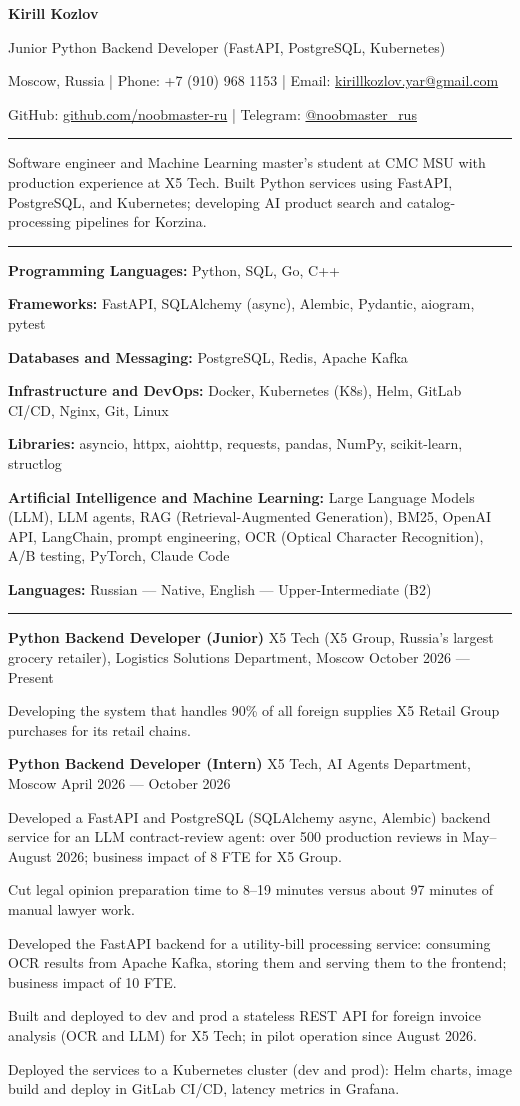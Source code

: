 \documentclass[10pt,a4paper]{article}
\newcommand{\cvsection}[1]{%
  \vspace{5pt}{\large\bfseries #1}\par\vspace{2pt}\hrule\vspace{4pt}}
\newcommand{\cventry}[3]{%
  \textbf{#1} \textbar{} #3 \textbar{} #2\par\vspace{1pt}}
\newcommand{\skilllangs}{\textbf{Programming Languages:} Python, SQL, Go, C++\par}
\newcommand{\skillai}{\textbf{Artificial Intelligence and Machine Learning:} Large Language Models (LLM),
LLM agents, RAG (Retrieval-Augmented Generation), BM25, OpenAI API, LangChain, prompt engineering,
OCR (Optical Character Recognition), A/B testing, PyTorch, Claude Code\par}
\newcommand{\skillframeworks}{\textbf{Frameworks:} FastAPI, SQLAlchemy (async), Alembic, Pydantic, aiogram, pytest\par}
\newcommand{\skilllibs}{\textbf{Libraries:} asyncio, httpx, aiohttp, requests, pandas, NumPy, scikit-learn, structlog\par}
\newcommand{\skilldb}{\textbf{Databases and Messaging:} PostgreSQL, Redis, Apache Kafka\par}
\newcommand{\skillinfra}{\textbf{Infrastructure and DevOps:} Docker, Kubernetes (K8s), Helm, GitLab CI/CD, Nginx, Git, Linux\par}
\newcommand{\skillhuman}{\textbf{Languages:} Russian --- Native, English --- Upper-Intermediate (B2)}
\begin{document}
{\LARGE\bfseries Kirill Kozlov}\par\vspace{3pt}
Junior Python Backend Developer (FastAPI, PostgreSQL, Kubernetes)\par\vspace{3pt}
Moscow, Russia | Phone: +7 (910) 968 1153 | Email: \href{mailto:kirillkozlov.yar@gmail.com}{kirillkozlov.yar@gmail.com}\par
GitHub: \href{https://github.com/noobmaster-ru}{github.com/noobmaster-ru} | Telegram: \href{https://t.me/noobmaster_rus}{@noobmaster\_rus}

\cvsection{Professional Summary}
Software engineer and Machine Learning master's student at CMC MSU with production experience at X5 Tech. Built Python services using FastAPI, PostgreSQL, and Kubernetes; developing AI product search and catalog-processing pipelines for Korzina.

\cvsection{Technical Skills}
\skilllangs
\skillframeworks\skilldb\skillinfra\skilllibs\skillai
\skillhuman

\cvsection{Work Experience}
\cventry{Python Backend Developer (Junior)}{October 2026 --- Present}{X5 Tech (X5 Group, Russia's largest grocery retailer), Logistics Solutions Department, Moscow}
\begin{cvitems}
    \item Developing the system that handles 90\% of all foreign supplies X5 Retail Group purchases for its retail chains.
\end{cvitems}
\vspace{2pt}

\cventry{Python Backend Developer (Intern)}{April 2026 --- October 2026}{X5 Tech, AI Agents Department, Moscow}
\begin{cvitems}
%
    \item Developed a FastAPI and PostgreSQL (SQLAlchemy async, Alembic) backend service for an LLM contract-review agent: over 500 production reviews in May--August 2026; business impact of 8 FTE for X5 Group.
    \item Cut legal opinion preparation time to 8--19 minutes versus about 97 minutes of manual lawyer work.
    \item Developed the FastAPI backend for a utility-bill processing service: consuming OCR results from Apache Kafka, storing them and serving them to the frontend; business impact of 10 FTE.
    \item Built and deployed to dev and prod a stateless REST API for foreign invoice analysis (OCR and LLM) for X5 Tech; in pilot operation since August 2026.
    \item Deployed the services to a Kubernetes cluster (dev and prod): Helm charts, image build and deploy in GitLab CI/CD, latency metrics in Grafana.%

\end{cvitems}
\end{document}
